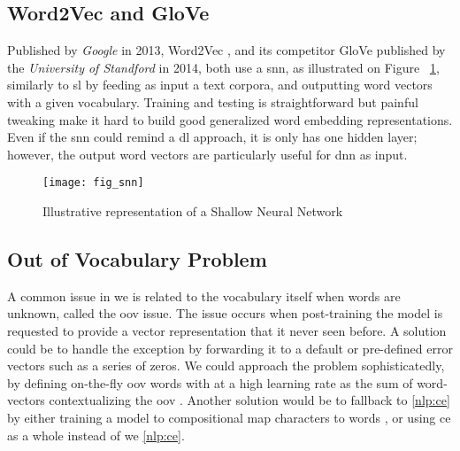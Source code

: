 \subsection{Word2Vec and GloVe}
\label{nlp:word2vec}
Published by \textit{Google} in 2013, Word2Vec \autocite{paper:word2vec}, and its competitor GloVe \autocite{paper:glove} published by the \textit{University of Standford} in 2014, both use a \gls{snn}, as illustrated on Figure ~\ref{fig:fig_snn}, similarly to \gls{sl} by feeding as input a text corpora, and outputting word vectors with a given vocabulary. Training and testing is straightforward but painful tweaking make it hard to build good generalized word embedding representations. Even if the \gls{snn} could remind a \gls{dl} approach, it is only has one hidden layer; however, the output word vectors are particularly useful for \gls{dnn} as input.

\begin{figure}[H]
    \centering
    \texttt{[image: fig\_snn]}
    \caption{Illustrative representation of a Shallow Neural Network}
    \label{fig:fig_snn}
\end{figure}

\subsection{Out of Vocabulary Problem}
\label{nlp:oov}
A common issue in \gls{we} is related to the vocabulary itself when words are unknown, called the \gls{oov} issue. The issue occurs when post-training the model is requested to provide a vector representation that it never seen before. A solution could be to handle the exception by forwarding it to a default or pre-defined error vectors such as a series of zeros. We could approach the problem sophisticatedly, by defining on-the-fly \gls{oov} words with at a high learning rate as the sum of word-vectors contextualizing the \gls{oov}  \autocite{paper:journals/corr/HerbelotB17}. Another solution would be to fallback to \ref{nlp:ce} by either training a model to compositional map characters to words \autocite{paper:journals/corr/PinterGE17}, or using \gls{ce} as a whole instead of \gls{we} \ref{nlp:ce}.

